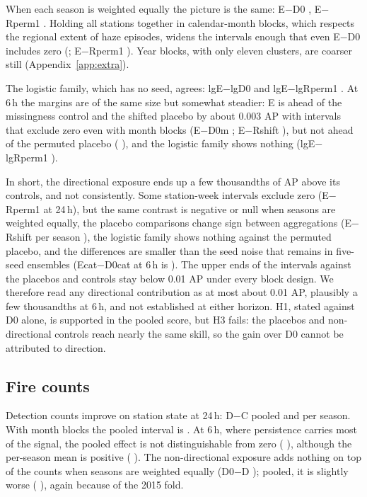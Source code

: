 When each season is weighted equally the picture is the same: E$-$D0 
, E$-$Rperm1  . Holding all
stations together in calendar-month blocks, which respects the regional extent of haze episodes,
widens the intervals enough that even E$-$D0 includes zero (; E$-$Rperm1
).
Year blocks, with only eleven clusters, are coarser still (Appendix~\ref{app:extra}).

The logistic family, which has no seed, agrees: lgE$-$lgD0 
 and lgE$-$lgRperm1  .
At 6\,h the margins are of the same size but somewhat steadier: E is ahead of the missingness
control and the shifted placebo by about 0.003 AP with intervals that exclude zero even with
month blocks (E$-$D0m  ; E$-$Rshift
 ), but not ahead of the permuted placebo
( ), and the logistic family shows nothing
(lgE$-$lgRperm1  ).

In short, the directional exposure ends up a few thousandths of AP above its controls, and not
consistently. Some station-week intervals exclude zero (E$-$Rperm1 at 24\,h), but the same
contrast is negative or null when seasons are weighted equally, the placebo comparisons change
sign between aggregations (E$-$Rshift per season 
), the logistic family shows nothing against the permuted placebo, and the
differences are smaller than the seed noise that remains in five-seed ensembles (Ecat$-$D0cat at
6\,h is ). The upper ends of the intervals against the placebos and
controls stay below 0.01 AP under every block design. We therefore read any directional
contribution as at most about 0.01 AP, plausibly a few thousandths at 6\,h, and not established
at either horizon. H1, stated against D0 alone, is supported in the pooled score, but
H3 fails: the placebos and non-directional controls reach nearly the same skill, so the gain over
D0 cannot be attributed to direction.

\subsection{Fire counts}

Detection counts improve on station state at 24\,h: D$-$C  
pooled and   per season. With month blocks the pooled interval
is . At 6\,h, where persistence carries most of the signal, the pooled
effect is not distinguishable from zero ( ), although the
per-season mean is positive ( ). The non-directional exposure adds
nothing on top of the counts when seasons are weighted equally (D0$-$D 
); pooled, it is slightly worse ( ), again
because of the 2015 fold.

